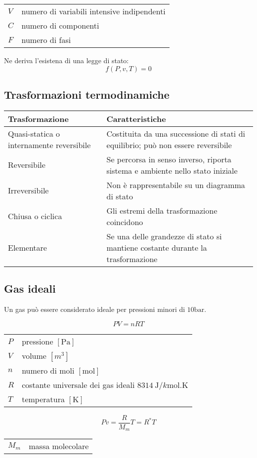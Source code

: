 \begin{tabular}{ll}
    $V$ & numero di variabili intensive indipendenti \\
    $C$ & numero di componenti \\
    $F$ & numero di fasi \\
\end{tabular}

Ne deriva l'esistena di una legge di stato:
\[f(P, v, T) = 0\]

\subsection{Trasformazioni termodinamiche}
\begin{tabular}{p{3.1cm}p{4cm}}
    \toprule
    Trasformazione & Caratteristiche \\
    \midrule
    Quasi-statica o \newline internamente reversibile & Costituita da una successione di stati di equilibrio; può non essere reversibile \\
    Reversibile & Se percorsa in senso inverso, riporta sistema e ambiente nello stato iniziale \\
    Irreversibile & Non è rappresentabile su un diagramma di stato \\
    Chiusa o ciclica & Gli estremi della trasformazione coincidono \\
    Elementare & Se una delle grandezze di stato si mantiene costante durante la trasformazione \\
    \bottomrule
\end{tabular}

\subsection{Gas ideali}
Un gas può essere considerato ideale per pressioni minori di $\si{10\bar}$.

\[PV = nRT\]
\begin{tabular}{ll}
    $P$ & pressione $[\si{\pascal}]$ \\
    $V$ & volume $[\si{m^3}]$ \\
    $n$ & numero di moli $[\si{\mol}]$ \\
    $R$ & costante universale dei gas ideali $\SI{8314}{\J/k\mol.\K}$ \\
    $T$ & temperatura $[\si{\K}]$
\end{tabular}

\[Pv = \frac{R}{M_m}T = R^*T \]
\begin{tabular}{ll}
    $M_m$ & massa molecolare \\
\end{tabular}

